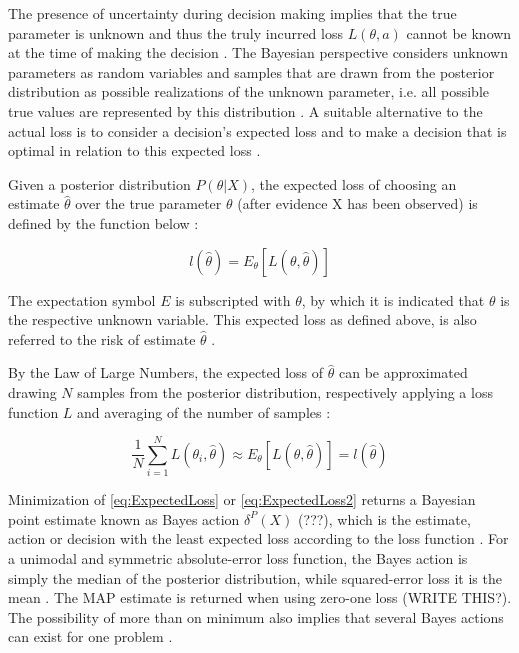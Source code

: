         The presence of uncertainty during decision making implies that the true parameter is unknown and thus the truly incurred loss $L(\theta,a)$ cannot be known at the time of making the decision \cite{berger2013stat, davidson2015}. The Bayesian perspective considers unknown parameters as random variables and samples that are drawn from the posterior distribution as possible realizations of the unknown parameter, i.e. all possible true values are represented by this distribution \cite{davidson2015}. A suitable alternative to the actual loss is to consider a decision's expected loss and to make a decision that is optimal in relation to this expected loss \cite{berger2013stat}. 
        
        Given a posterior distribution $P(\theta|X)$, the expected loss of choosing an estimate $\hat{\theta}$ over the true parameter $\theta$ (after evidence X has been observed) is defined by the function below \cite{davidson2015}:
        
        \begin{equation}\label{eq:ExpectedLoss}
        l(\hat{\theta}) = E_{\theta}[L(\theta,\hat{\theta})]
        \end{equation}  
        
        The expectation symbol $E$ is subscripted with $\theta$, by which it is indicated that $\theta$ is the respective unknown variable. This expected loss as defined above, is also referred to the risk of estimate $\hat{\theta}$ \cite{davidson2015}.
        
        By the Law of Large Numbers, the expected loss of $\hat{\theta}$ can be approximated drawing $N$ samples from the posterior distribution, respectively applying a loss function $L$ and averaging of the number of samples \cite{davidson2015}:
        
        \begin{equation}\label{eq:ExpectedLoss2}
        \frac{1}{N}\sum_{i=1}^{N} L(\theta_i,\hat{\theta}) \approx E_{\theta}[L(\theta,\hat{\theta})] = l(\hat{\theta})
        \end{equation}
        
        Minimization of \ref{eq:ExpectedLoss} or \ref{eq:ExpectedLoss2} returns a Bayesian point estimate known as Bayes action $\delta^P(X)$ (???), which is the estimate, action or decision with the least expected loss according to the loss function \cite{berger2013stat}. For a unimodal and symmetric absolute-error loss function, the Bayes action is simply the median of the posterior distribution, while squared-error loss it is the mean \cite{davidson2015, berger2013stat}. The MAP estimate is returned when using zero-one loss \cite{davidson2015}  (WRITE THIS?). The possibility of more than on minimum also implies that several Bayes actions can exist for one problem \cite{berger2013stat}.
        
